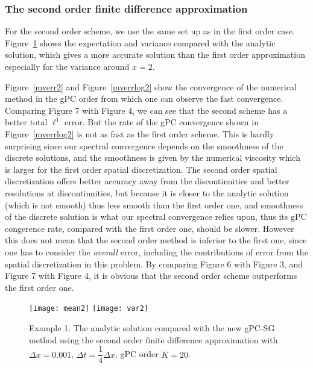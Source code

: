 \documentclass[12pt]{article}
\theoremstyle{plain}
\theoremstyle{remark}
\theoremstyle{remark}
\theoremstyle{remark}
\numberwithin{equation}{section}
\newcommand{\ie}{{\it i.e. \/}}
\begin{document}
\subsubsection{The second order finite difference approximation}
For the second order scheme, we use the same set up as in the first order case. Figure~\ref{mv2} shows the expectation and variance compared with the analytic solution,
which gives a more accurate solution than the first
order approximation especially for the variance around $x=2$. 

Figure~\ref{mverr2} and Figure~\ref{mverrlog2} show the convergence of the numerical method in the gPC order from which one can observe the fast convergence. Comparing Figure 7 with Figure 4, we can see that the second scheme has a better total $\ell^1$ error. But the rate of the gPC convergence shown in Figure~\ref{mverrlog2} is  not as fast as the first order scheme. This is hardly surprising since our spectral convergence
depends on the smoothness of the discrete solutions, and the smoothness is
given by the numerical viscosity which is larger 
for the first order spatial discretization. The second order spatial
discretization offers better accuracy away from the discontinuities and better
resolutions at discontinuities, but  because it is closer
to the analytic solution (which is not smooth) thus less smooth than the first order one, and smoothness of the discrete solution is what 
 our spectral convergence relies upon, thus its gPC congerence rate, compared with
the first order one, should be slower.  However this does not mean that 
the second order method is inferior to the first one, since one has to 
consider the {\it overall} error, including the contributions of error from
the spatial discretization in this problem. By comparing  Figure 6 with Figure 3, and 
Figure 7 with Figure 4, it is obvious that the second order scheme outperforms
the first order one.
 
\begin{figure}[htbp]
  \texttt{[image: mean2]}
  \texttt{[image: var2]}
  \caption{Example 1. The analytic solution compared with the new gPC-SG method using the second order finite difference approximation with  $\Delta x = 0.001$, $\Delta t = \dfrac{1}{4}\Delta x$, gPC order $K=20$.}
  \label{mv2}
\end{figure}
\end{document}
